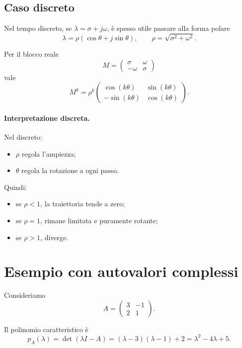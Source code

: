 \subsection{Caso discreto}

Nel tempo discreto, se $\lambda=\sigma+j\omega$, è spesso utile passare alla forma polare
\[
\lambda=\rho(\cos\theta+j\sin\theta),
\qquad
\rho=\sqrt{\sigma^2+\omega^2}.
\]

Per il blocco reale
\[
M=
\begin{pmatrix}
\sigma & \omega\\
-\omega & \sigma
\end{pmatrix}
\]
vale
\begin{equation}
M^k
=
\rho^k
\begin{pmatrix}
\cos(k\theta) & \sin(k\theta)\\
-\sin(k\theta) & \cos(k\theta)
\end{pmatrix}.
\label{eq:L6_power_real_complex_block}
\end{equation}

\paragraph{Interpretazione discreta.}
Nel discreto:
\begin{itemize}
    \item $\rho$ regola l'ampiezza;
    \item $\theta$ regola la rotazione a ogni passo.
\end{itemize}

Quindi:
\begin{itemize}
    \item se $\rho<1$, la traiettoria tende a zero;
    \item se $\rho=1$, rimane limitata e puramente rotante;
    \item se $\rho>1$, diverge.
\end{itemize}

\section{Esempio con autovalori complessi}

Consideriamo
\[
A=
\begin{pmatrix}
3 & -1\\
2 & 1
\end{pmatrix}.
\]

Il polinomio caratteristico è
\[
p_A(\lambda)=\det(\lambda I-A)
=
(\lambda-3)(\lambda-1)+2
=
\lambda^2-4\lambda+5.
\]

